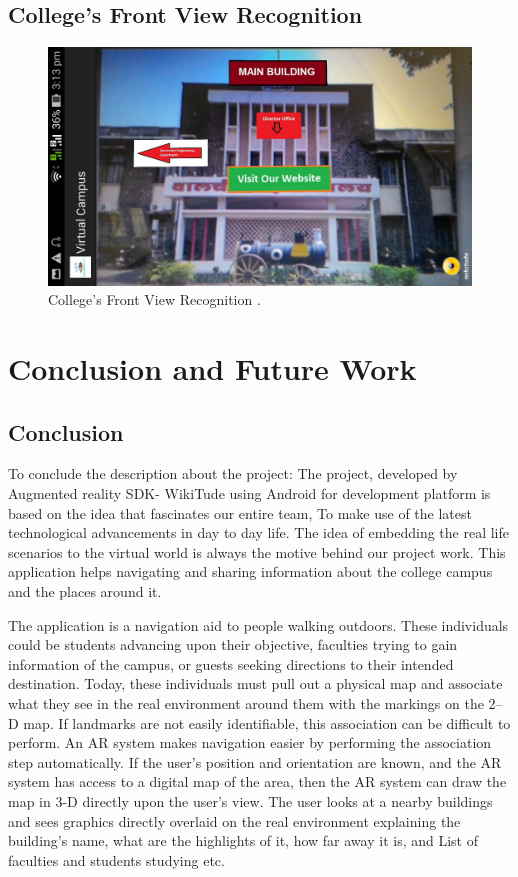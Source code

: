 \documentclass{article}
\begin{document}
\subsection{College's Front View Recognition}
\begin{figure}[h]
	\includegraphics[scale=0.2,angle=90]{MainBuilding.jpg}
	\caption{College's Front View Recognition . }
\end{figure}



\newpage
\section{Conclusion and Future Work}
\subsection{Conclusion}
\par To conclude the description about the project: The project, developed by Augmented reality SDK- WikiTude using Android for development platform is based on the idea that fascinates our entire team, To make use of the latest technological advancements in day to day life. The idea of embedding the real life scenarios to the virtual world is always the motive behind our project work. This application helps navigating and sharing information about the college campus and the places around it. 
\par The application is a navigation aid to people walking outdoors.  These individuals could be students advancing upon their objective, faculties trying to gain information of the campus, or guests seeking directions to their intended destination.  Today, these individuals must pull out a physical map and associate what they see in the real environment around them with the markings on the 2–D map.  If landmarks are not easily identifiable, this association can be difficult to perform.  An AR system makes navigation easier by performing the association step automatically.  If the user's position and orientation are known, and the AR system has access to a digital map of the area, then the AR system can draw the map in 3-D directly upon the user's view.  The user looks at a nearby buildings and sees graphics directly overlaid on the real environment explaining the building’s name, what are the highlights of it, how far away it is, and List of faculties and students studying etc. 
\end{document}
